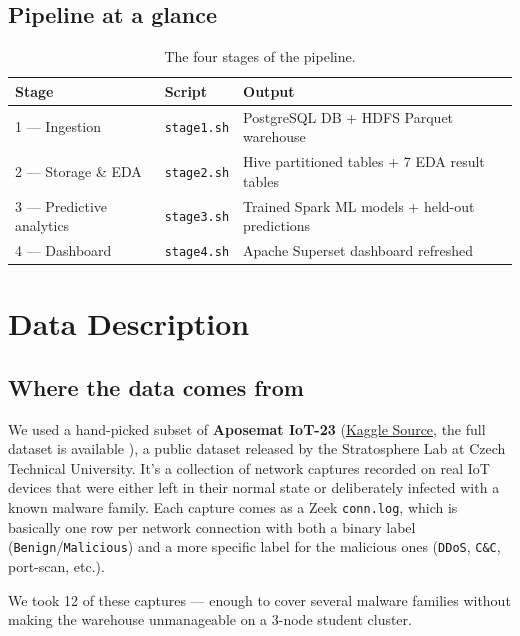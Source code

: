 \documentclass[11pt,a4paper]{article}
\begin{document}
\subsection{Pipeline at a glance}

\begin{table}[H]
\centering
\small
\begin{tabular}{lll}
\toprule
\textbf{Stage} & \textbf{Script} & \textbf{Output} \\
\midrule
1 --- Ingestion & \texttt{stage1.sh} & PostgreSQL DB + HDFS Parquet warehouse \\
2 --- Storage \& EDA & \texttt{stage2.sh} & Hive partitioned tables + 7 EDA result tables \\
3 --- Predictive analytics & \texttt{stage3.sh} & Trained Spark ML models + held-out predictions \\
4 --- Dashboard & \texttt{stage4.sh} & Apache Superset dashboard refreshed \\
\bottomrule
\end{tabular}
\caption{The four stages of the pipeline.}
\end{table}

\section{Data Description}

\subsection{Where the data comes from}

We used a hand-picked subset of \textbf{Aposemat IoT-23} (\href{https://www.kaggle.com/datasets/agungpambudi/network-malware-detection-connection-analysis?select=CTU-IoT-Malware-Capture-44-1conn.log.labeled.csv}{Kaggle Source}, the full dataset is available \cite{dataset_source}), a public dataset
released by the Stratosphere Lab at Czech Technical University. It's a
collection of network captures recorded on real IoT devices that were
either left in their normal state or deliberately infected with a known
malware family. Each capture comes as a Zeek \texttt{conn.log}, which is
basically one row per network connection with both a binary label
(\texttt{Benign}/\texttt{Malicious}) and a more specific label for the
malicious ones (\texttt{DDoS}, \texttt{C\&C}, port-scan, etc.).

We took 12 of these captures --- enough to cover several malware families
without making the warehouse unmanageable on a 3-node student cluster.
\end{document}
